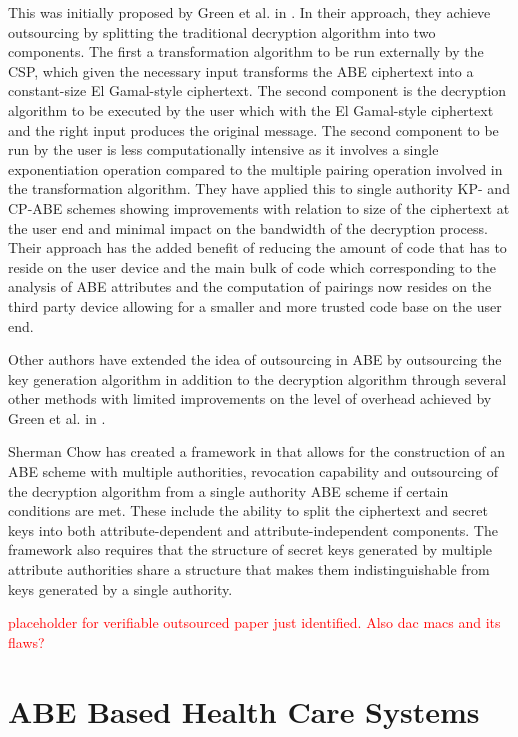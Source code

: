This was initially proposed by Green et al. in \cite{Green2011outsource}. In their approach, they achieve outsourcing by splitting the traditional decryption algorithm into two components. The first a transformation algorithm to be run externally by the CSP, which given the necessary input transforms the ABE ciphertext into a constant-size El Gamal-style ciphertext. The second component is the decryption algorithm to be executed by the user which with the El Gamal-style ciphertext and the right input produces the original message. The second component to be run by the user is less computationally intensive as it involves a single exponentiation operation compared to the multiple pairing operation involved in the transformation algorithm. They have applied this to single authority KP- and CP-ABE schemes showing improvements with relation to size of the ciphertext at the user end and  minimal impact on the bandwidth of the decryption process. Their approach has the added benefit of reducing the amount of code that has to reside on the user device and the main bulk of code which corresponding to the analysis of ABE attributes and the computation of pairings now resides on the third party device allowing for a smaller and more trusted code base on the user end.

Other authors \cite{Li2013outsource}\cite{Li2014outsource} have extended the idea of outsourcing in ABE by outsourcing the key generation algorithm in addition to the decryption algorithm through several other methods with limited improvements on the level of overhead achieved by Green et al. in \cite{Green2011outsource}.

Sherman Chow has created a framework in \cite{Chow2016outscourceframe} that allows for the construction of an ABE scheme with multiple authorities, revocation capability and outsourcing of the decryption algorithm from a single authority ABE scheme if certain conditions are met. These include the ability to split the ciphertext and secret keys into both attribute-dependent and attribute-independent components. The framework also requires that the structure of secret keys generated by multiple attribute authorities share a structure that makes them indistinguishable from keys generated by a single authority.

\textcolor{red}{placeholder for verifiable outsourced paper just identified. Also dac macs and its flaws?}


\section{ABE Based Health Care Systems}

